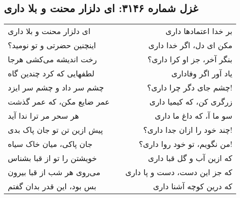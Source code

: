 \begin{center}
\section*{غزل شماره ۳۱۴۶: ای دلزار محنت و بلا داری}
\label{sec:3146}
\begin{longtable}{l p{0.5cm} r}
ای دلزار محنت و بلا داری
&&
بر خدا اعتمادها داری
\\
اینچنین حضرتی و تو نومید؟
&&
مکن ای دل، اگر خدا داری
\\
رخت اندیشه می‌کشی هرجا
&&
بنگر آخر، جز او کرا داری؟
\\
لطفهایی که کرد چندین گاه
&&
یاد آور اگر وفاداری
\\
چشم سر داد و چشم سر ایزد
&&
چشم جای دگر چرا داری؟!
\\
عمر ضایع مکن، که عمر گذشت
&&
زرگری کن، که کیمیا داری
\\
هر سحر مر ترا ندا آید
&&
سو ما آ، که داغ ما داری
\\
پیش ازین تن تو جان پاک بدی
&&
چند خود را ازان جدا داری؟!
\\
جان پاکی، میان خاک سیاه
&&
من نگویم، تو خود روا داری؟!
\\
خویشتن را تو از قبا بشناس
&&
که ازین آب و گل قبا داری
\\
می‌روی هر شب از قبا بیرون
&&
که جز این دست، دست و پا داری
\\
بس بود، این قدر بدان گفتم
&&
که درین کوچه آشنا داری
\\
\end{longtable}
\end{center}
